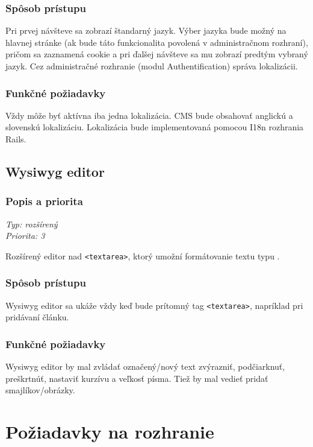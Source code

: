 \documentclass[a4paper,titlepage,11pt]{article}
\begin{document}
\subsubsection{Spôsob prístupu}
Pri prvej návšteve sa zobrazí štandarný jazyk. Výber jazyka bude možný na hlavnej stránke (ak bude táto funkcionalita povolená v administračnom rozhraní), pričom sa zaznamená cookie a pri ďalšej návšteve sa mu zobrazí predtým vybraný jazyk.
Cez administračné rozhranie (modul Authentification) správa lokalizácii.
\subsubsection{Funkčné požiadavky}
Vždy môže byť aktívna iba jedna lokalizácia. CMS bude obsahovať anglickú a slovenskú lokalizáciu. 
Lokalizácia bude implementovaná pomocou I18n rozhrania Rails.

\subsection{Wysiwyg editor}
\subsubsection{Popis a priorita}
\begin{flushleft}
 \emph{Typ: rozšírený}\\
 \emph{Priorita: 3}\\
\end{flushleft}
Rozšírený editor nad \verb|<textarea>|, ktorý umožní formátovanie textu typu .
\subsubsection{Spôsob prístupu}
Wysiwyg editor sa ukáže vždy keď bude prítomný tag \verb|<textarea>|, napríklad pri pridávaní článku.
\subsubsection{Funkčné požiadavky}
Wysiwyg editor by mal zvládať označený\slash nový text zvýrazniť, podčiarknuť, preškrtnúť, nastaviť kurzívu a veľkosť písma. 
Tiež by mal vedieť pridať smajlíkov\slash obrázky. 

\newpage
\section{Požiadavky na rozhranie}
\end{document}
